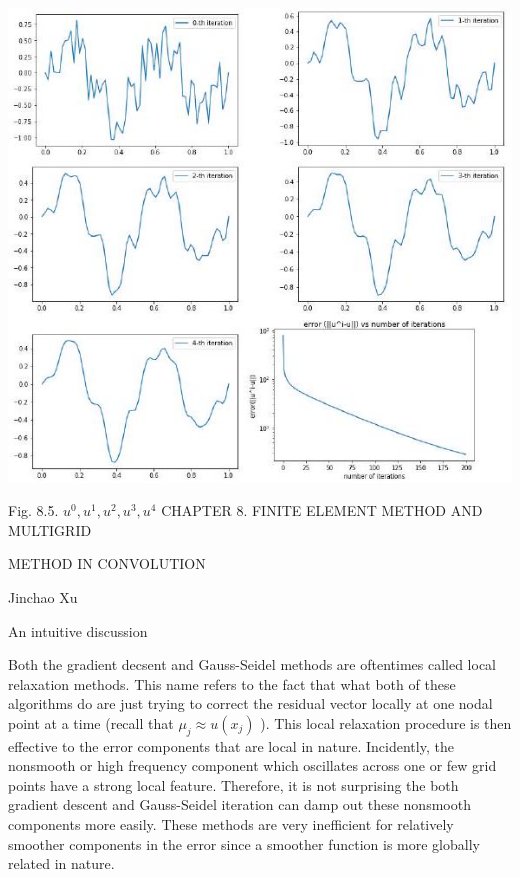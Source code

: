 \documentclass[10pt]{article}
\begin{document}
\includegraphics[max width=\textwidth]{2022_01_06_7eec630b8b060fb00b5bg-10}

Fig. 8.5. $u^{0}, u^{1}, u^{2}, u^{3}, u^{4}$ CHAPTER 8. FINITE ELEMENT METHOD AND MULTIGRID

METHOD IN CONVOLUTION

Jinchao $\mathrm{Xu}$

An intuitive discussion

Both the gradient decsent and Gauss-Seidel methods are oftentimes called local relaxation methods. This name refers to the fact that what both of these algorithms do are just trying to correct the residual vector locally at one nodal point at a time (recall that $\mu_{j} \approx u\left(x_{j}\right)$ ). This local relaxation procedure is then effective to the error components that are local in nature. Incidently, the nonsmooth or high frequency component which oscillates across one or few grid points have a strong local feature. Therefore, it is not surprising the both gradient descent and Gauss-Seidel iteration can damp out these nonsmooth components more easily. These methods are very inefficient for relatively smoother components in the error since a smoother function is more globally related in nature.
\end{document}
